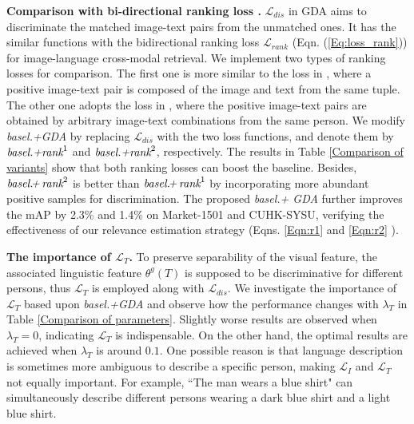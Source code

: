 \documentclass[runningheads]{llncs}
\begin{document}
 
  \noindent \textbf{Comparison with bi-directional ranking loss \cite{Dual-path, Karpathy:2014}.} $\mathcal{L}_{dis}$ in GDA aims to discriminate the matched image-text pairs from the unmatched ones. It has the similar functions  with the bidirectional ranking loss $\mathcal{L}_{rank}$ (Eqn. (\ref{Eq:loss_rank})) for image-language cross-modal retrieval.  We implement two types of ranking losses for comparison.  The first one is more similar to the loss in \cite{Karpathy:2014}, where a positive image-text pair is composed of the image and text from the same tuple. The other one adopts the loss in \cite{Dual-path}, where the positive image-text pairs are obtained by arbitrary image-text combinations from the same person.  We modify \emph{basel.+GDA} by replacing $\mathcal{L}_{dis}$ with the two loss functions,  and denote them by $\emph{basel.+rank}^{1} $ and $\emph{basel.+rank}^{2}$, respectively. The results in Table \ref{Comparison of variants} show that both ranking losses can boost the baseline. Besides, $\emph{basel.\!+\! rank}^{2} $ is better than $\emph{basel.\!+\! rank}^{1} $ by incorporating more abundant positive samples for discrimination. The proposed \emph{basel.\!+\! GDA} further improves the mAP by 2.3\% and 1.4\% on Market-1501 and CUHK-SYSU, verifying the effectiveness of our relevance estimation strategy (Eqns. \ref{Eqn:r1} and \ref{Eqn:r2} ).
 
 


 
\noindent   \textbf{The importance of $\mathcal{L}_{T}$.} To preserve separability of the visual feature, the associated linguistic feature $\theta^{g}(T)$ is supposed to be discriminative for different persons, thus $\mathcal{L}_{T}$ is employed along with $\mathcal{L}_{dis}$.  We investigate the importance of  $\mathcal{L}_{T}$ based upon \emph{basel.+GDA} and observe how the performance changes with $\lambda_{T}$ in Table \ref{Comparison of parameters}. Slightly worse results are observed when $\lambda_{T}=0$, indicating $\mathcal{L}_{T}$ is indispensable. On the other hand, the optimal results are achieved when $\lambda_{T}$ is around $0.1$. One possible reason is that language description is sometimes more ambiguous to describe a specific person, making $\mathcal{L}_{I}$ and $\mathcal{L}_{T}$ not equally important. For example, ``The man wears a blue shirt" can simultaneously describe different persons wearing a dark blue shirt and a light blue shirt. 
\end{document}
